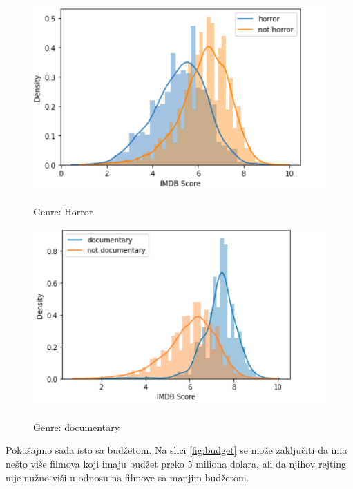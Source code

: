\documentclass[a4paper]{article}
\begin{document}
\begin{figure}[h!]
\centering
\begin{minipage}{.5\textwidth}
  \centering
  \includegraphics[scale=0.4]{horror.png}
  \caption{Genre: Horror}{}
  \label{fig:horror}
\end{minipage}%
\begin{minipage}{.5\textwidth}
  \centering
  \includegraphics[scale=0.4]{documentary.png}
   \caption{Genre: documentary}{}
  \label{fig:documentary}
\end{minipage}
\end{figure}

Pokušajmo sada isto sa budžetom. Na slici \ref{fig:budget} se može zaključiti da ima nešto više filmova koji imaju budžet preko 5 miliona dolara, ali da njihov rejting nije nužno viši u odnosu na filmove sa manjim budžetom.
\end{document}
